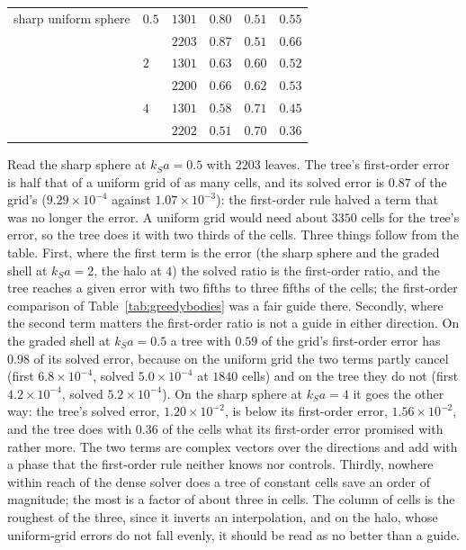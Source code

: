 \documentclass[11pt,a4paper]{article}
\begin{document}
\begin{table}[htbp]
\begin{tabular}{@{}llrccc@{}}
\midrule
sharp uniform sphere       & $0.5$ & $1301$ & $0.80$ & $0.51$ & $0.55$ \\
                           &       & $2203$ & $0.87$ & $0.51$ & $0.66$ \\
                           & $2$   & $1301$ & $0.63$ & $0.60$ & $0.52$ \\
                           &       & $2200$ & $0.66$ & $0.62$ & $0.53$ \\
                           & $4$   & $1301$ & $0.58$ & $0.71$ & $0.45$ \\
                           &       & $2202$ & $0.51$ & $0.70$ & $0.36$ \\
\bottomrule
\end{tabular}
\end{table}

Read the sharp sphere at $k_Sa=0.5$ with $2203$ leaves. The tree's first-order error is half that of a
uniform grid of as many cells, and its solved error is $0.87$ of the grid's ($9.29\times10^{-4}$ against
$1.07\times10^{-3}$): the first-order rule halved a term that was no longer the error. A uniform grid
would need about $3350$ cells for the tree's error, so the tree does it with two thirds of the cells.
Three things follow from the table. First, where the first term is the error (the sharp sphere and the
graded shell at $k_Sa=2$, the halo at $4$) the solved ratio is the first-order ratio, and the tree
reaches a given error with two fifths to three fifths of the cells; the first-order comparison of
Table~\ref{tab:greedybodies} was a fair guide there. Secondly, where the second term matters the
first-order ratio is not a guide in either direction. On the graded shell at $k_Sa=0.5$ a tree with
$0.59$ of the grid's first-order error has $0.98$ of its solved error, because on the uniform grid the
two terms partly cancel (first $6.8\times10^{-4}$, solved $5.0\times10^{-4}$ at $1840$ cells) and on the
tree they do not (first $4.2\times10^{-4}$, solved $5.2\times10^{-4}$). On the sharp sphere at
$k_Sa=4$ it goes the other way: the tree's solved error, $1.20\times10^{-2}$, is below its first-order
error, $1.56\times10^{-2}$, and the tree does with $0.36$ of the cells what its first-order error
promised with rather more. The two terms are complex vectors over the directions and add with a phase
that the first-order rule neither knows nor controls. Thirdly, nowhere within reach of the dense solver
does a tree of constant cells save an order of magnitude; the most is a factor of about three in cells. The
column of cells is the roughest of the three, since it inverts an interpolation, and on the halo, whose
uniform-grid errors do not fall evenly, it should be read as no better than a guide.
\end{document}
